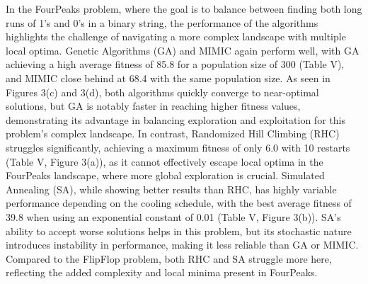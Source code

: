In the FourPeaks problem, where the goal is to balance between finding both long runs of 1's and 0's in a binary string, the performance of the algorithms highlights the challenge of navigating a more complex landscape with multiple local optima. Genetic Algorithms (GA) and MIMIC again perform well, with GA achieving a high average fitness of 85.8 for a population size of 300 (Table V), and MIMIC close behind at 68.4 with the same population size. As seen in Figures 3(c) and 3(d), both algorithms quickly converge to near-optimal solutions, but GA is notably faster in reaching higher fitness values, demonstrating its advantage in balancing exploration and exploitation for this problem's complex landscape. In contrast, Randomized Hill Climbing (RHC) struggles significantly, achieving a maximum fitness of only 6.0 with 10 restarts (Table V, Figure 3(a)), as it cannot effectively escape local optima in the FourPeaks landscape, where more global exploration is crucial. Simulated Annealing (SA), while showing better results than RHC, has highly variable performance depending on the cooling schedule, with the best average fitness of 39.8 when using an exponential constant of 0.01 (Table V, Figure 3(b)). SA's ability to accept worse solutions helps in this problem, but its stochastic nature introduces instability in performance, making it less reliable than GA or MIMIC. Compared to the FlipFlop problem, both RHC and SA struggle more here, reflecting the added complexity and local minima present in FourPeaks.

